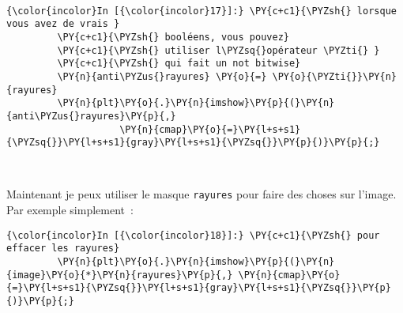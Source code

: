     \begin{center}
    \end{center}
    { \hspace*{\fill} \\}
    
    \begin{Verbatim}[commandchars=\\\{\}]
{\color{incolor}In [{\color{incolor}17}]:} \PY{c+c1}{\PYZsh{} lorsque vous avez de vrais }
         \PY{c+c1}{\PYZsh{} booléens, vous pouvez}
         \PY{c+c1}{\PYZsh{} utiliser l\PYZsq{}opérateur \PYZti{} }
         \PY{c+c1}{\PYZsh{} qui fait un not bitwise}
         \PY{n}{anti\PYZus{}rayures} \PY{o}{=} \PY{o}{\PYZti{}}\PY{n}{rayures}
         \PY{n}{plt}\PY{o}{.}\PY{n}{imshow}\PY{p}{(}\PY{n}{anti\PYZus{}rayures}\PY{p}{,}
                    \PY{n}{cmap}\PY{o}{=}\PY{l+s+s1}{\PYZsq{}}\PY{l+s+s1}{gray}\PY{l+s+s1}{\PYZsq{}}\PY{p}{)}\PY{p}{;}
\end{Verbatim}


    \begin{center}
    \end{center}
    { \hspace*{\fill} \\}
    
    Maintenant je peux utiliser le masque \texttt{rayures} pour faire des
choses sur l'image. Par exemple simplement~:

    \begin{Verbatim}[commandchars=\\\{\}]
{\color{incolor}In [{\color{incolor}18}]:} \PY{c+c1}{\PYZsh{} pour effacer les rayures}
         \PY{n}{plt}\PY{o}{.}\PY{n}{imshow}\PY{p}{(}\PY{n}{image}\PY{o}{*}\PY{n}{rayures}\PY{p}{,} \PY{n}{cmap}\PY{o}{=}\PY{l+s+s1}{\PYZsq{}}\PY{l+s+s1}{gray}\PY{l+s+s1}{\PYZsq{}}\PY{p}{)}\PY{p}{;}
\end{Verbatim}


    \begin{center}
    \end{center}
    { \hspace*{\fill} \\}
    
